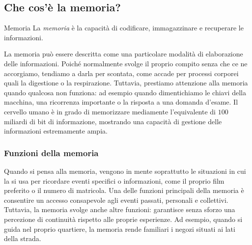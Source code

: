 \documentclass[a4paper]{article}
\begin{document}
\subsection{Che cos'è la memoria?}
\begin{snippetdefinition}{Memoria}
    La \emph{memoria} è la capacità di codificare, immagazzinare e recuperare le informazioni.
\end{snippetdefinition}
La memoria può essere descritta come una particolare modalità di elaborazione delle informazioni. Poiché normalmente svolge il proprio compito senza che ce ne accorgiamo, tendiamo a darla per scontata, come accade per processi corporei quali la digestione o la respirazione.
Tuttavia, prestiamo attenzione alla memoria quando qualcosa non funziona: ad esempio quando dimentichiamo le chiavi della macchina, una ricorrenza importante o la risposta a una domanda d'esame. Il cervello umano è in grado di memorizzare mediamente l'equivalente di \(100\) miliardi di bit di informazione, mostrando una capacità di gestione delle informazioni estremamente ampia.
\subsubsection{Funzioni della memoria}
Quando si pensa alla memoria, vengono in mente soprattutto le situazioni in cui la si usa per ricordare eventi specifici o informazioni, come il proprio film preferito o il numero di matricola.
Una delle funzioni principali della memoria è consentire un accesso consapevole agli eventi passati, personali e collettivi. Tuttavia, la memoria svolge anche altre funzioni: garantisce senza sforzo una percezione di continuità rispetto alle proprie esperienze. Ad esempio, quando si guida nel proprio quartiere, la memoria rende familiari i negozi situati ai lati della strada.
\end{document}
